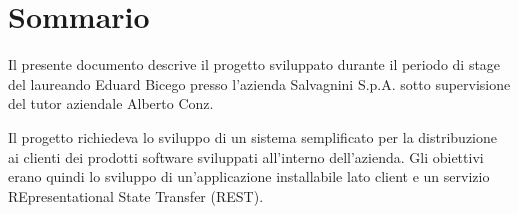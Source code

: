 \cleardoublepage
{}
{}
\begingroup
\let\clearpage\relax
\let\cleardoublepage\relax
\let\cleardoublepage\relax

\chapter*{Sommario}

Il presente documento descrive il progetto sviluppato durante il periodo di stage del laureando Eduard Bicego presso l'azienda Salvagnini S.p.A. sotto supervisione del tutor aziendale Alberto Conz. 
		
		\noindent Il progetto richiedeva lo sviluppo di un sistema semplificato per la distribuzione ai clienti dei prodotti software sviluppati all'interno dell'azienda. Gli obiettivi erano quindi lo sviluppo di un'applicazione installabile lato client e un servizio REpresentational State Transfer (REST).

\endgroup			

\vfill